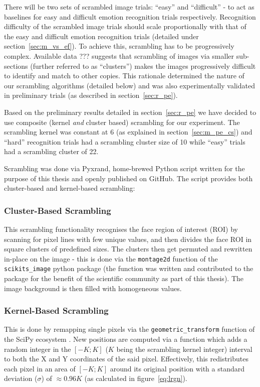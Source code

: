 	    There will be two sets of scrambled image trials: “easy” and “difficult” - to act as baselines for easy and difficult emotion recognition trials respectively.
	    Recognition difficulty of the scrambled image trials should scale proportionally with that of the easy and difficult emotion recognition trials (detailed under section~\ref{sec:m_vs_ef}).
	    To achieve this, scrambling has to be progressively complex.
	    Available data ??? suggests that scrambling of images via smaller sub-sections (further referred to as “clusters”) makes the images progressively difficult to identify and match to other copies.
	    This rationale determined the nature of our scrambling algorithms (detailed below) and was also experimentally validated in preliminary trials (as described in section~\ref{sec:r_pe}).
	    
	    Based on the preliminary results detailed in section~\ref{sec:r_pe} we have decided to use composite (kernel \textit{and} cluster based) scrambling for our experiment.
	    The scrambling kernel was constant at \SI{6}{\pixel} (as explained in section~\ref{sec:m_pe_cs}) 
	    and “hard” recognition trials had a scrambling cluster size of \SI{10}{\pixel} while “easy” trials had a scrambling cluster of \SI{22}{\pixel}.
	    
	    Scrambling was done via Pyxrand\cite{pyxrand}, home-brewed Python script written for the purpose of this thesis and openly published on GitHub.
	    The script provides both cluster-based and kernel-based scrambling:
	    \subsubsection{Cluster-Based Scrambling}
		This scrambling functionality recognises the face region of interest (ROI) by scanning for pixel lines with few unique values, and then divides the face ROI in square clusters of predefined sizes.
		The clusters then get permuted and rewritten in-place on the image - this is done via the \colorbox{vlg}{\texttt{montage2d}} function of the \colorbox{vlg}{\texttt{scikits\_image}} python package 
		(the function was written and contributed to the package for the benefit of the scientific community as part of this thesis).
		The image background is then filled with homogeneous values.
	    \subsubsection{Kernel-Based Scrambling}\label{sec:m_vs_si_kbs}
		This is done by remapping single pixels via the \colorbox{vlg}{\texttt{geometric\_transform}} function of the SciPy ecosystem \cite{scipy,Oliphant2007}.
		New positions are computed via a function which adds a random integer in the $[-K;K]$ ($K$ being the scrambling kernel integer) interval to both the X and Y coordinates of the said pixel.
		Effectively, this redistributes each pixel in an area of $[-K;K]$ around its original position with a standard deviation ($\sigma$) of $\approx 0.96K$ (as calculated in figure~\ref{eq:lrgn}).
